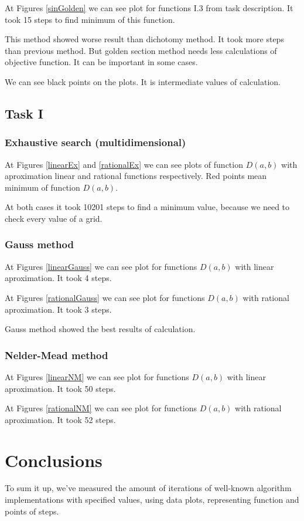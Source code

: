 \documentclass[a4paper,article,14pt]{extarticle}
\begin{document}
	At Figures \ref{sinGolden} we can see plot for functions I.3 from task description. It took 15 steps to find minimum of this function.
	
	This method showed worse result than dichotomy method. It took more steps than previous method. But golden section method needs less calculations of objective function. It can be important in some cases.
	
	We can see black points on the plots. It is intermediate values of calculation. 
	
	\subsection{Task I}
	\subsubsection{Exhaustive search (multidimensional)}
	
	At Figures \ref{linearEx} and \ref{rationalEx} we can see plots of function $D(a,b)$ with aproximation linear and rational functions respectively. Red points mean minimum of function $D(a,b)$.
	
	At both cases it took 10201 steps to find a minimum value, because we need to check every value of a grid.
	
	\subsubsection{Gauss method}
	
	At Figures \ref{linearGauss} we can see plot for functions $D(a,b)$ with linear aproximation. It took 4 steps.
	
	At Figures \ref{rationalGauss} we can see plot for functions $D(a,b)$ with rational aproximation. It took 3 steps.
	
	Gauss method showed the best results of calculation.
	
	\subsubsection{Nelder-Mead method}
	
	At Figures \ref{linearNM} we can see plot for functions $D(a,b)$ with linear aproximation. It took 50 steps.
	
	At Figures \ref{rationalNM} we can see plot for functions $D(a,b)$ with rational aproximation. It took 52 steps.
	
	\section{Conclusions}
	To sum it up, we’ve measured the amount of iterations of well-known algorithm implementations with specified values, using data plots, representing function and points of steps.
	
\end{document}
